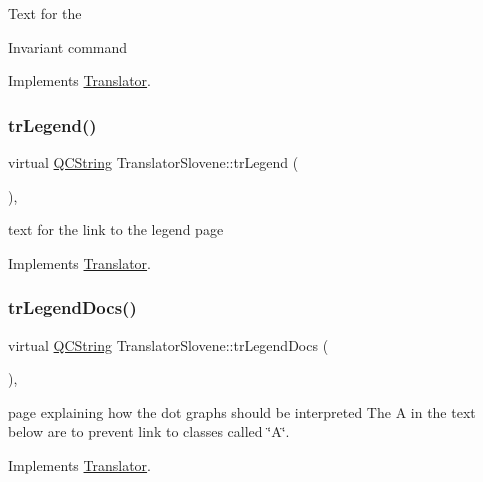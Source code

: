Text for the \begin{DoxyInvariant}{Invariant}
command 
\end{DoxyInvariant}


Implements \mbox{\hyperlink{class_translator}{Translator}}.

\mbox{\label{class_translator_slovene_a40da91c6f0cd0595974b7f06201ba9ad}} 
\subsubsection{\texorpdfstring{trLegend()}{trLegend()}}
{\footnotesize\ttfamily virtual \mbox{\hyperlink{class_q_c_string}{Q\+C\+String}} Translator\+Slovene\+::tr\+Legend (\begin{DoxyParamCaption}{ }\end{DoxyParamCaption})\hspace{0.3cm}{\ttfamily [inline]}, {\ttfamily [virtual]}}

text for the link to the legend page 

Implements \mbox{\hyperlink{class_translator}{Translator}}.

\mbox{\label{class_translator_slovene_a1f997f8cea119d9c78f2fd56d3108c09}} 
\subsubsection{\texorpdfstring{trLegendDocs()}{trLegendDocs()}}
{\footnotesize\ttfamily virtual \mbox{\hyperlink{class_q_c_string}{Q\+C\+String}} Translator\+Slovene\+::tr\+Legend\+Docs (\begin{DoxyParamCaption}{ }\end{DoxyParamCaption})\hspace{0.3cm}{\ttfamily [inline]}, {\ttfamily [virtual]}}

page explaining how the dot graph\textquotesingle{}s should be interpreted The A in the text below are to prevent link to classes called \char`\"{}\+A\char`\"{}. 

Implements \mbox{\hyperlink{class_translator}{Translator}}.

\mbox{\label{class_translator_slovene_aec8bc99ae2e1aa19b8399c733f592ae5}} 
